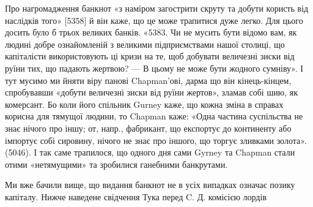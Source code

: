 Про нагромадження банкнот «з наміром загострити скруту та добути
користь від наслідків того» [5358] й він каже, що це може трапитися дуже
легко. Для цього досить було б трьох великих банків. «5383. Чи не мусить
бути відомо вам, як людині добре ознайомленій з великими підприємствами
нашої столиці, що капіталісти використовують ці кризи на те, щоб добувати
величезні зиски від руїни тих, що падають жертвою? — В цьому не може
бути жодного сумніву». І тут мусимо ми йняти віру панові Chapman’ові, дарма
що він кінець-кінцем, спробувавши «добути величезні зиски від руїни жертов»,
зламав собі шию, як комерсант. Бо коли його спільник Gurney каже, що кожна
зміна в справах корисна для тямущої людини, то Chapman каже: «Одна
частина суспільства не знає нічого про іншу; от, напр., фабрикант, що експортує
до континенту або імпортує собі сировину, нічого не знає про іншого,
що торгує зливками золота». (5046). І так саме трапилося, що одного дня
сами Gyrney та Chapman стали отими «нетямущими» та зробилися ганебними
банкрутами.

Ми вже бачили вище, що видання банкнот не в усіх випадках означає
позику капіталу. Нижче наведене свідчення Тука перед C. Д. комісією лордів
\parbreak{}  %
